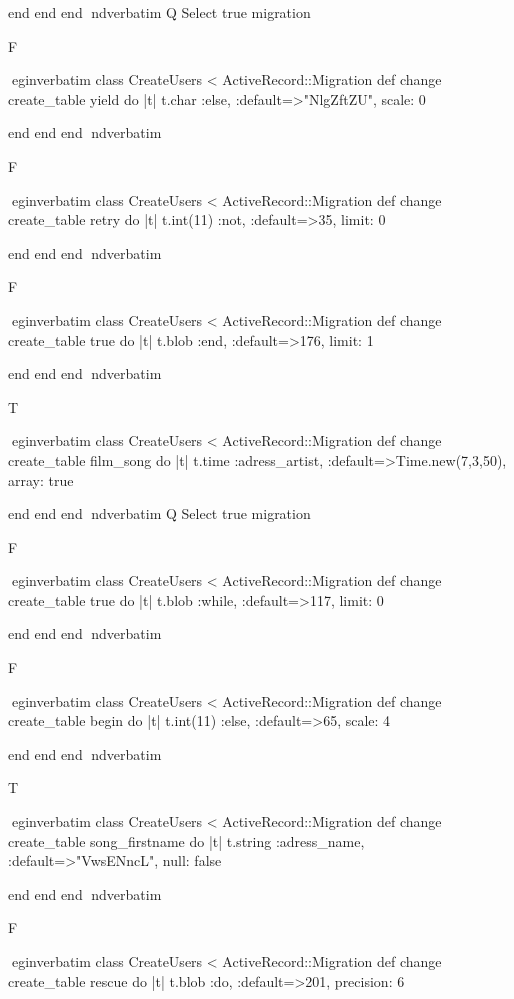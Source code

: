     end 
  end 
end
nd{verbatim}
Q
 Select true migration

F

egin{verbatim}
 class CreateUsers < ActiveRecord::Migration 
  def change 
    create_table yield do |t| 
      t.char :else, :default=>"NlgZftZU", scale: 0
    
    end 
  end 
end
nd{verbatim}

F

egin{verbatim}
 class CreateUsers < ActiveRecord::Migration 
  def change 
    create_table retry do |t| 
      t.int(11) :not, :default=>35, limit: 0
    
    end 
  end 
end
nd{verbatim}

F

egin{verbatim}
 class CreateUsers < ActiveRecord::Migration 
  def change 
    create_table true do |t| 
      t.blob :end, :default=>176, limit: 1
    
    end 
  end 
end
nd{verbatim}

T

egin{verbatim}
 class CreateUsers < ActiveRecord::Migration 
  def change 
    create_table film_song do |t| 
      t.time :adress_artist, :default=>Time.new(7,3,50), array: true
    
    end 
  end 
end
nd{verbatim}
Q
 Select true migration

F

egin{verbatim}
 class CreateUsers < ActiveRecord::Migration 
  def change 
    create_table true do |t| 
      t.blob :while, :default=>117, limit: 0
    
    end 
  end 
end
nd{verbatim}

F

egin{verbatim}
 class CreateUsers < ActiveRecord::Migration 
  def change 
    create_table begin do |t| 
      t.int(11) :else, :default=>65, scale: 4
    
    end 
  end 
end
nd{verbatim}

T

egin{verbatim}
 class CreateUsers < ActiveRecord::Migration 
  def change 
    create_table song_firstname do |t| 
      t.string :adress_name, :default=>"VwsENncL", null: false
    
    end 
  end 
end
nd{verbatim}

F

egin{verbatim}
 class CreateUsers < ActiveRecord::Migration 
  def change 
    create_table rescue do |t| 
      t.blob :do, :default=>201, precision: 6
    
